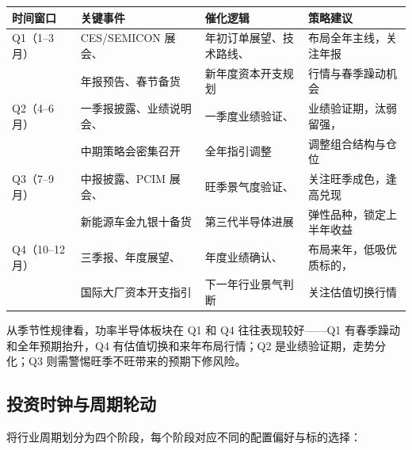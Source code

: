 \begin{exhibitbox}[表 11-10：年度催化日历与策略建议]
\centering
\small
\begin{tabularx}{\textwidth}{X L{3.0cm} L{4.5cm} L{4.0cm}}
\toprule
\textbf{时间窗口} & \textbf{关键事件} & \textbf{催化逻辑} & \textbf{策略建议} \\
\midrule
{}
Q1（1–3月） & CES/SEMICON 展会、 & 年初订单展望、技术路线、 & 布局全年主线，关注年报 \\
& 年报预告、春节备货 & 新年度资本开支规划 & 行情与春季躁动机会 \\
\midrule
{}
Q2（4–6月） & 一季报披露、业绩说明会、 & 一季度业绩验证、 & 业绩验证期，汰弱留强， \\
& 中期策略会密集召开 & 全年指引调整 & 调整组合结构与仓位 \\
\midrule
{}
Q3（7–9月） & 中报披露、PCIM 展会、 & 旺季景气度验证、 & 关注旺季成色，逢高兑现 \\
& 新能源车金九银十备货 & 第三代半导体进展 & 弹性品种，锁定上半年收益 \\
\midrule
{}
Q4（10–12月） & 三季报、年度展望、 & 年度业绩确认、 & 布局来年，低吸优质标的， \\
& 国际大厂资本开支指引 & 下一年行业景气判断 & 关注估值切换行情 \\
\bottomrule
\end{tabularx}
\end{exhibitbox}

从季节性规律看，功率半导体板块在 Q1 和 Q4 往往表现较好——Q1 有春季躁动和全年预期抬升，Q4 有估值切换和来年布局行情；Q2 是业绩验证期，走势分化；Q3 则需警惕旺季不旺带来的预期下修风险。

\subsection{投资时钟与周期轮动}

将行业周期划分为四个阶段，每个阶段对应不同的配置偏好与标的选择：

